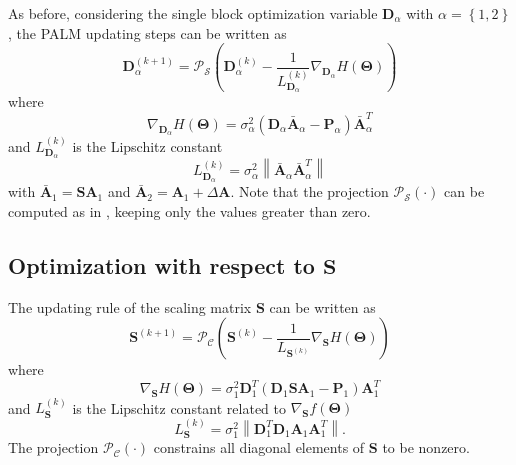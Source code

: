 \documentclass[review]{elsarticle}
\begin{document}
As before, considering the single block optimization variable $\mathbf{D}_{\alpha}$ with $\alpha = \left\{1,2\right\}$, the PALM updating steps can be written as
\begin{equation}
	\label{eq:dictionary_Update}
		\mathbf{D}_{\alpha}^{(k+1)} = \mathcal{P}_{\mathcal{S}}\left(\mathbf{D}_{\alpha}^{(k)} - \frac{1}{L_{\mathbf{D}_{\alpha}}^{(k)} }\nabla_{\mathbf{D}_{\alpha}} H(\boldsymbol{\Theta}) \right)
\end{equation}
where
\begin{equation}
		\nabla_{\mathbf{D}_{\alpha}} H(\boldsymbol{\Theta}) = \sigma^2_{\alpha}\left( \mathbf{D}_{\alpha}\bar{\mathbf{A}}_{\alpha} -\mathbf{P}_{\alpha}\right)\bar{\mathbf{A}}_{\alpha}^{T}
        \label{eq:nabla_dict}
\end{equation}
and
$L_{\mathbf{D}_{\alpha}}^{(k)} $ is the Lipschitz constant
\begin{equation}
		L_{\mathbf{D}_{\alpha}}^{(k)} = \sigma_{\alpha}^{2}\left\|\bar{\mathbf{A}}_{\alpha}\bar{\mathbf{A}}_{\alpha}^{T}\right\|
        \label{eq:lip_dict}
\end{equation}
with $\bar{\mathbf{A}}_{1} = \mathbf{S}\mathbf{A}_{1}$ and $\bar{\mathbf{A}}_{2} = \mathbf{A}_{1} + \Delta\mathbf{A}$. Note that the projection $\mathcal{P}_{\mathcal{S}}(\cdot)$ can be computed as in \citet{mairal_online_2009}, keeping only the values greater than zero.

\subsection{Optimization with respect to \texorpdfstring{$\mathbf{S}$}{S}}
The updating rule of the scaling matrix $\mathbf{S}$ can be written as
\begin{equation}
		\mathbf{S}^{(k+1)} = \mathcal{P}_{\mathcal{C}}\left(\mathbf{S}^{(k)} - \frac{1}{L_{\mathbf{S}^{(k)}}}\nabla_{\mathbf{S}} H(\boldsymbol{\Theta}) \right)
        \label{eq:scale_Update}
\end{equation}
where
\begin{equation}
		\nabla_{\mathbf{S}}H(\boldsymbol{\Theta}) = \sigma_{1}^2\mathbf{D}_{1}^{T}\left( \mathbf{D}_{1}\mathbf{S}\mathbf{A}_{1} - \mathbf{P}_{1}\right)\mathbf{A}_{1}^{T}
        \label{eq:nabla_scale}
\end{equation}
and $L_{\mathbf{S}}^{(k)}$ is the Lipschitz constant related to $\nabla_{\mathbf{S}}f(\boldsymbol{\Theta})$
\begin{equation}
		L_{\mathbf{S}}^{(k)} = \sigma_{1}^2\left\|\mathbf{D}_{1}^{T}\mathbf{D}_{1}\mathbf{A}_{1}\mathbf{A}_{1}^{T}\right\|.
        \label{eq:lip_scale}
\end{equation}
The projection $\mathcal{P}_{\mathcal{C}}(\cdot)$ constrains all diagonal elements of $\mathbf{S}$ to be nonzero.
\end{document}
